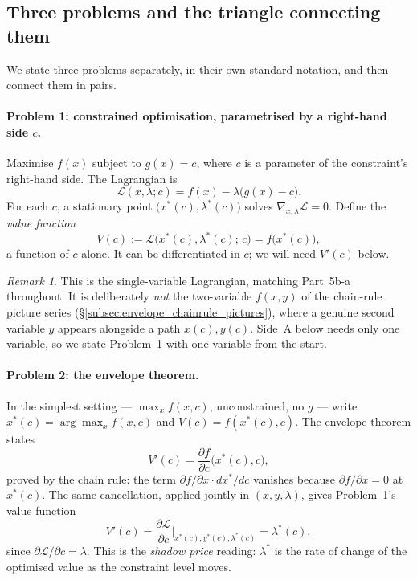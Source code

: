 \documentclass[a4paper,oneside,12pt]{extarticle}
\theoremstyle{plain}
\theoremstyle{definition}
\theoremstyle{remark}
\newtheorem{remark}[proposition]{Remark}
\begin{document}
\subsection{Three problems and the triangle connecting them}
\label{subsec:envelope_lm_summary}

We state three problems separately, in their own standard notation,
and then connect them in pairs.

\paragraph{Problem 1: constrained optimisation, parametrised by a
right-hand side $c$.}
Maximise $f(x)$ subject to $g(x)=c$, where $c$ is a parameter of the
constraint's right-hand side. The Lagrangian is
\[
  \mathcal{L}(x,\lambda;c) = f(x) - \lambda\big(g(x)-c\big).
\]
For each $c$, a stationary point $\big(x^*(c),\lambda^*(c)\big)$
solves $\nabla_{x,\lambda}\mathcal{L}=0$. Define the \emph{value
function}
\[
  V(c) := \mathcal{L}\big(x^*(c),\lambda^*(c);\,c\big)
        = f\big(x^*(c)\big),
\]
a function of $c$ alone. It can be differentiated in $c$; we will
need $V'(c)$ below.

\begin{remark}
This is the single-variable Lagrangian, matching Part~5b-a
throughout. It is deliberately \emph{not} the two-variable $f(x,y)$
of the chain-rule picture series
(\S\ref{subsec:envelope_chainrule_pictures}), where a genuine
second variable $y$ appears alongside a path $x(c),y(c)$. Side~A
below needs only one variable, so we state Problem~1 with one
variable from the start.
\end{remark}

\paragraph{Problem 2: the envelope theorem.}
In the simplest setting --- $\max_x f(x,c)$, unconstrained, no $g$
--- write $x^*(c)=\arg\max_xf(x,c)$ and $V(c)=f(x^*(c),c)$. The
envelope theorem states
\[
  V'(c) = \frac{\partial f}{\partial c}\Big(x^*(c),c\Big),
\]
proved by the chain rule: the term $\partial f/\partial
x\cdot dx^*/dc$ vanishes because $\partial f/\partial x=0$ at
$x^*(c)$. The same cancellation, applied jointly in
$(x,y,\lambda)$, gives Problem~1's value function
\[
  V'(c) = \frac{\partial\mathcal{L}}{\partial c}
  \bigg|_{x^*(c),y^*(c),\lambda^*(c)} = \lambda^*(c),
\]
since $\partial\mathcal{L}/\partial c=\lambda$. This is the
\emph{shadow price} reading: $\lambda^*$ is the rate of change of
the optimised value as the constraint level moves.
\end{document}
